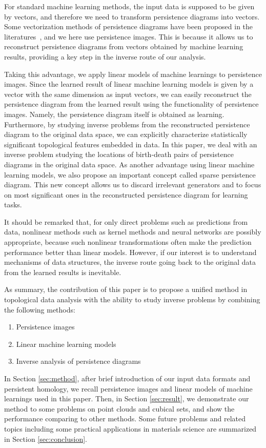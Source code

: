 \documentclass[smallextended]{svjour3}
\begin{document}
For standard machine learning methods, the input data is supposed to be given by vectors, and therefore we need to transform persistence diagrams into vectors. Some vectorization methods of persistence diagrams have been proposed in the literatures~\citep{persistence_image,landscape,kusano1,kusano2,pssk}, and we here use persistence images. This is because it allows us to reconstruct persistence diagrams from vectors obtained by machine learning results, providing a key step in the inverse route of our analysis. 

Taking this advantage, we apply linear models of machine learnings to persistence images. Since the learned result of linear machine learning models is given by a vector with the same dimension as input vectors, we can easily reconstruct the persistence diagram from the learned result using the functionality of persistence images. 
Namely, the persistence diagram itself is obtained as learning. Furthermore, by studying inverse problems from the reconstructed persistence diagram to the original data space, we can explicitly characterize statistically significant topological features embedded in data. In this paper, we deal with an inverse problem studying the locations of birth-death pairs of persistence diagrams in the original data space. As another advantage using linear machine learning models, we also propose an important concept called sparse persistence diagram. This new concept allows us to discard irrelevant generators and to focus on most significant ones in the reconstructed persistence diagram for learning tasks. 


It should be remarked that, for only direct problems such as predictions from data, nonlinear methods such as kernel methods and neural networks are possibly appropriate, because such nonlinear transformations often make the prediction performance better than linear models. However, if our interest is to understand mechanisms of data structures, the inverse route going back to the original data from the learned results is inevitable. 

As summary, the contribution of this paper is to propose a unified method in topological data analysis with the ability to study inverse problems by combining the following methods:
  \begin{enumerate}
  \item Persistence images
  \item Linear machine learning models
  \item Inverse analysis of persistence diagrams
  \end{enumerate}
In Section \ref{sec:method}, after brief introduction of our input data formats and persistent homology, we recall persistence images and linear models of machine learnings used in this paper. Then, in Section \ref{sec:result}, we demonstrate our method to some problems on point clouds and cubical sets, and show the performance comparing to other methods. Some future problems and related topics including some practical applications in materials science are summarized in Section \ref{sec:conclusion}.
  
\end{document}
